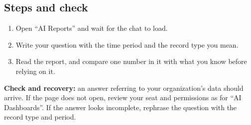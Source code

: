 \subsection{Steps and check}
\begin{enumerate}
\item Open “AI Reports” and wait for the chat to load.
\item Write your question with the time period and the record type you mean.
\item Read the report, and compare one number in it with what you know before relying on it.
\end{enumerate}

\textbf{Check and recovery:} an answer referring to your organization's data should arrive. If the page does not open, review your seat and permissions as for “AI Dashboards”. If the answer looks incomplete, rephrase the question with the record type and period.
